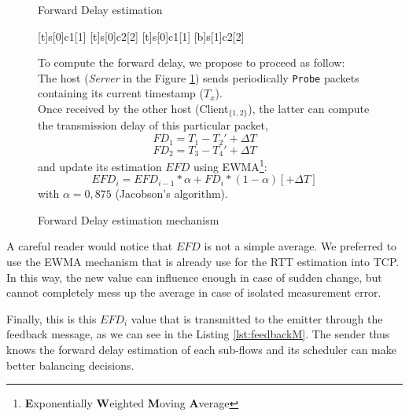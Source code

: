 \begin{figure}[!h]
\begin{minipage}[c]{.55\linewidth}
\begin{msc}[r]{Forward Delay estimation}

\setlength{\instfootheight}{0em}
\setlength{\instheadheight}{0em}
\setlength{\instdist}{0.25\linewidth}
\setlength{\levelheight}{3em}


[t]{s}[0]{c1}[1]
\nextlevel
{}[t]{s}[0]{c2}[2]
\nextlevel
{}[t]{s}[0]{c1}[1]
[b]{s}[1]{c2}[2]
\nextlevel
{}
\nextlevel
{}
\nextlevel
\end{msc}
\caption{Forward Delay estimation mechanism}
\label{fig:forwardDelayComputation}
\end{minipage}
\begin{minipage}[c]{.44\linewidth}
To compute the forward delay, we propose to proceed as follow:\\

The host (\textit{Server} in the Figure \ref{fig:forwardDelayComputation}) sends periodically \texttt{Probe} packets containing its current timestamp ($T_x$).\\

Once received by the other host (Client$_{\{1,2\}}$), the latter can compute the transmission delay of this particular packet,
$$FD_1 = T_1 - T_2' + \Delta{}T$$
$$FD_2 = T_3 - T_4' + \Delta{}T$$
and update its estimation $EFD$ using EWMA\footnote{\textbf{E}xponentially \textbf{W}eighted \textbf{M}oving \textbf{A}verage}:
$$EFD_{i} = EFD_{i-1}*\alpha + FD_i*(1-\alpha) [+ \Delta T]$$
with $\alpha = 0,875$ (Jacobson's algorithm).
\end{minipage}
\end{figure}

\newpage
A careful reader would notice that $EFD$ is not a simple average. We preferred to use the EWMA mechanism that is already use for the RTT estimation into TCP. In this way, the new value can influence enough in case of sudden change, but cannot completely mess up the average in case of isolated measurement error.

Finally, this is this $EFD_{i}$ value that is transmitted to the emitter through the feedback message, as we can see in the Listing \ref{lst:feedbackM}. The sender thus knows the forward delay estimation of each sub-flows and its scheduler can make better balancing decisions.

